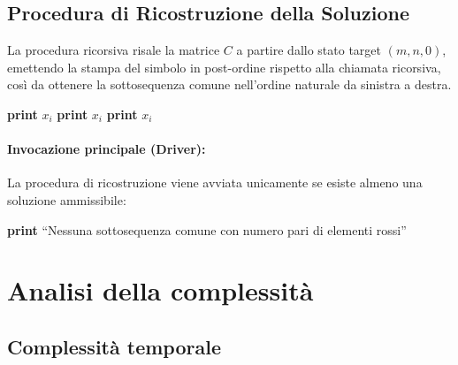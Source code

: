 \subsection{Procedura di Ricostruzione della Soluzione}
La procedura ricorsiva risale la matrice $C$ a partire dallo stato target $(m, n, 0)$, emettendo la stampa del simbolo in post-ordine rispetto alla chiamata ricorsiva, così da ottenere la sottosequenza comune nell'ordine naturale da sinistra a destra.\begin{algorithm}[H]
\caption{Ricostruzione della soluzione ottima}
\begin{algorithmic}[1]
\State \Return
\EndIf{}
        \State {}
    \Else
        \State {}
    \EndIf
{}
    \State {}
    \State \textbf{print} $x_i$
\Else {}
            \State {}
            \State \textbf{print} $x_i$
        \Else
            \State {}
        \EndIf
    \Else {}
        \State {}
        \State \textbf{print} $x_i$
    \EndIf
\EndIf
\EndProcedure
\end{algorithmic}
\end{algorithm}\paragraph{Invocazione principale (Driver):} La procedura di ricostruzione viene avviata unicamente se esiste almeno una soluzione ammissibile:
\begin{algorithm}[H]
\begin{algorithmic}[1]
\State \textbf{print} ``Nessuna sottosequenza comune con numero pari di elementi rossi''
\Else
\State {}
\EndIf
\end{algorithmic}
\end{algorithm}\section{Analisi della complessità}\subsection{Complessità temporale}

